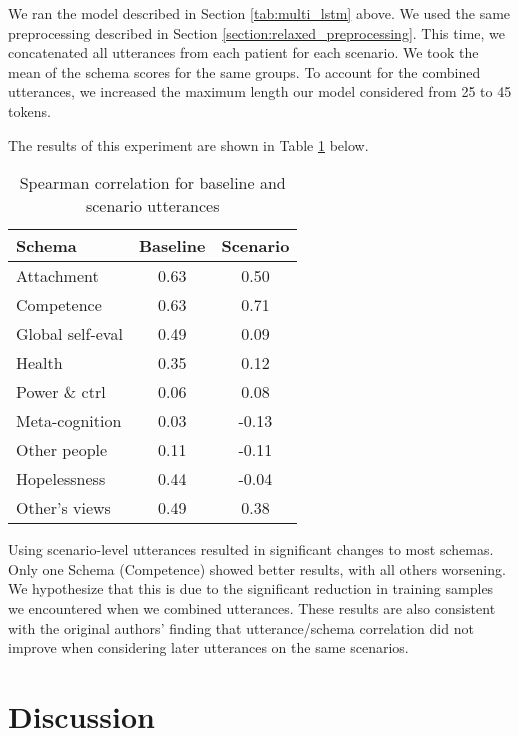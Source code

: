 \documentclass[11pt,a4paper]{article}
\begin{document}
We ran the model described in Section \ref{tab:multi_lstm} above. We used the same preprocessing described in Section \ref{section:relaxed_preprocessing}. This time, we concatenated all utterances from each patient for each scenario. We took the mean of the schema scores for the same groups. To account for the combined utterances, we increased the maximum length our model considered from 25 to 45 tokens. 

The results of this experiment are shown in Table \ref{tab:scenario_preprocessing} below.

\begin{table}[H]
\centering
\begin{tabular}{lcc}
\toprule
Schema                  &Baseline          &Scenario \\ %
\midrule
Attachment              & 0.63 & 0.50 \\
Competence              & 0.63 & 0.71 \\
Global self-eval        & 0.49 & 0.09 \\
Health                  & 0.35 & 0.12 \\
Power \& ctrl           & 0.06 & 0.08 \\
Meta-cognition          & 0.03 & -0.13 \\
Other people            & 0.11 & -0.11 \\
Hopelessness            & 0.44 & -0.04 \\
Other's views           & 0.49 & 0.38 \\
\bottomrule
\end{tabular}
\caption{Spearman correlation for baseline and scenario utterances}
\label{tab:scenario_preprocessing}
\end{table}

Using scenario-level utterances resulted in significant changes to most schemas. Only one Schema (Competence) showed better results, with all others worsening. We hypothesize that this is due to the significant reduction in training samples we encountered when we combined utterances. These results are also consistent with the original authors' finding that utterance/schema correlation did not improve when considering later utterances on the same scenarios.

\section{Discussion}
\end{document}
